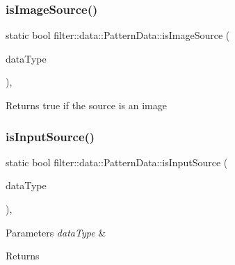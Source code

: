 \subsubsection{\texorpdfstring{is\+Image\+Source()}{isImageSource()}}
{\footnotesize\ttfamily static bool filter\+::data\+::\+Pattern\+Data\+::is\+Image\+Source (\begin{DoxyParamCaption}\item[{I\+O\+Data\+Type}]{data\+Type }\end{DoxyParamCaption})\hspace{0.3cm}{\ttfamily [inline]}, {\ttfamily [static]}}

\begin{DoxyReturn}{Returns}
true if the source is an image 
\end{DoxyReturn}
\mbox{\label{classfilter_1_1data_1_1_pattern_data_a8be8618185495e9a86f73f4f506a80f7}} 
\subsubsection{\texorpdfstring{is\+Input\+Source()}{isInputSource()}}
{\footnotesize\ttfamily static bool filter\+::data\+::\+Pattern\+Data\+::is\+Input\+Source (\begin{DoxyParamCaption}\item[{I\+O\+Data\+Type}]{data\+Type }\end{DoxyParamCaption})\hspace{0.3cm}{\ttfamily [inline]}, {\ttfamily [static]}}


\begin{DoxyParams}{Parameters}
{\em data\+Type} & \\
\hline
\end{DoxyParams}
\begin{DoxyReturn}{Returns}

\end{DoxyReturn}
\mbox{\label{classfilter_1_1data_1_1_pattern_data_ae677a413e5b1cf4bccdc4effc1598a7f}} 
